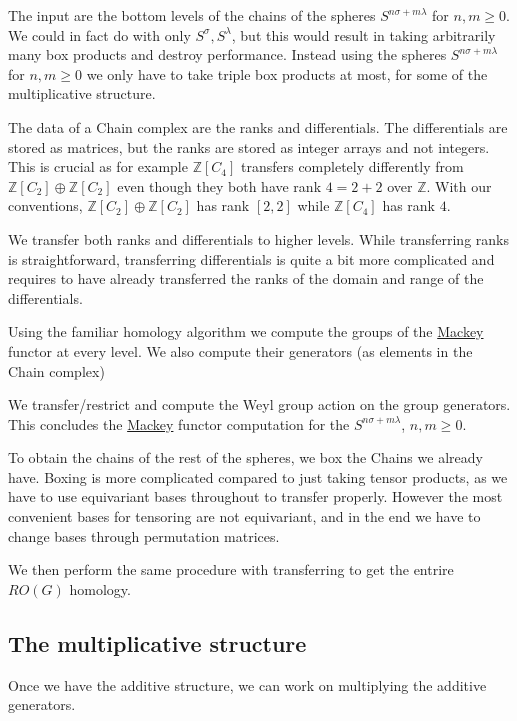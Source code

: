 \begin{DoxyItemize}
\item The input are the bottom levels of the chains of the spheres $S^{n\sigma+m\lambda}$ for $n,m\ge 0$. We could in fact do with only $S^{\sigma},S^{\lambda}$, but this would result in taking arbitrarily many box products and destroy performance. Instead using the spheres $S^{n\sigma+m\lambda}$ for $n,m\ge 0$ we only have to take triple box products at most, for some of the multiplicative structure.
\item The data of a Chain complex are the ranks and differentials. The differentials are stored as matrices, but the ranks are stored as integer arrays and not integers. This is crucial as for example $\mathbb Z[C_4]$ transfers completely differently from $\mathbb Z[C_2]\oplus \mathbb Z[C_2]$ even though they both have rank $4=2+2$ over $\mathbb Z$. With our conventions, $\mathbb Z[C_2]\oplus \mathbb Z[C_2]$ has rank $[2,2]$ while $\mathbb Z[C_4]$ has rank $4$.
\item We transfer both ranks and differentials to higher levels. While transferring ranks is straightforward, transferring differentials is quite a bit more complicated and requires to have already transferred the ranks of the domain and range of the differentials.
\item Using the familiar homology algorithm we compute the groups of the \hyperlink{namespaceMackey}{Mackey} functor at every level. We also compute their generators (as elements in the Chain complex)
\item We transfer/restrict and compute the Weyl group action on the group generators. This concludes the \hyperlink{namespaceMackey}{Mackey} functor computation for the $S^{n\sigma+m\lambda}$, $n,m\ge 0$.
\item To obtain the chains of the rest of the spheres, we box the Chains we already have. Boxing is more complicated compared to just taking tensor products, as we have to use equivariant bases throughout to transfer properly. However the most convenient bases for tensoring are not equivariant, and in the end we have to change bases through permutation matrices.
\item We then perform the same procedure with transferring to get the entrire $RO(G)$ homology.
\end{DoxyItemize}\hypertarget{math_mult}{}\subsection{The multiplicative structure}\label{math_mult}
Once we have the additive structure, we can work on multiplying the additive generators.


